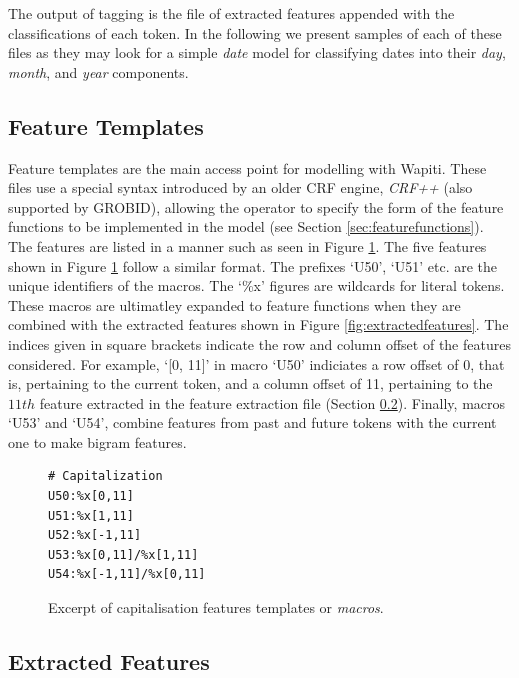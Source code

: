 The output of tagging is the file of extracted features appended with the classifications of each token. In the following we present samples of each of these files as they may look for a simple \emph{date} model for classifying dates into their \emph{day}, \emph{month}, and \emph{year} components.

\subsection{Feature Templates}
\label{subsec:featuretemplates}

Feature templates are the main access point for modelling with Wapiti. These files use a special syntax introduced by an older CRF engine, \emph{CRF++} (also supported by GROBID), allowing the operator to specify the form of the feature functions to be implemented in the model (see Section \ref{sec:featurefunctions}). The features are listed in a manner such as seen in Figure \ref{fig:featuretemplatefile}. The five features shown in Figure \ref{fig:featuretemplatefile} follow a similar format. The prefixes `U50', `U51' etc. are the unique identifiers of the macros. The `\%x' figures are wildcards for literal tokens. These macros are ultimatley expanded to feature functions when they are combined with the extracted features shown in Figure \ref{fig:extractedfeatures}. The indices given in square brackets indicate the row and column offset of the features considered. For example, `[0, 11]' in macro `U50' indiciates a row offset of $0$, that is, pertaining to the current token, and a column offset of 11, pertaining to the $11th$ feature extracted in the feature extraction file (Section \ref{subsec:extractedfeatures}). Finally, macros `U53' and `U54', combine features from past and future tokens with the current one to make bigram features.

\begin{figure}
\centering
\begin{BVerbatim}
# Capitalization
U50:%x[0,11]
U51:%x[1,11]
U52:%x[-1,11]
U53:%x[0,11]/%x[1,11]
U54:%x[-1,11]/%x[0,11]
\end{BVerbatim}
\caption{Excerpt of capitalisation features templates or \emph{macros}.}
\label{fig:featuretemplatefile}
\end{figure}

\subsection{Extracted Features}
\label{subsec:extractedfeatures}

